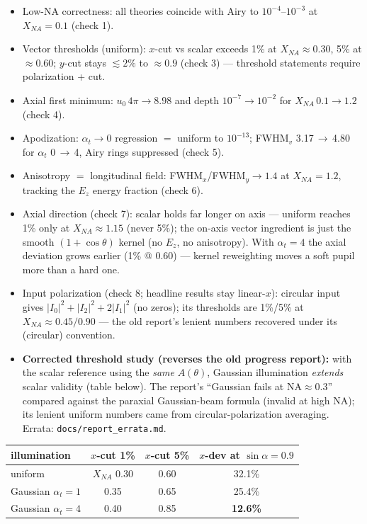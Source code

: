 \documentclass[10pt]{article}
\begin{document}
\begin{itemize}\itemsep1pt
\item Low-NA correctness: all theories coincide with Airy to
  $10^{-4}$--$10^{-3}$ at $X_{NA}=0.1$ (check 1).
\item Vector thresholds (uniform): $x$-cut vs scalar exceeds 1\% at
  $X_{NA}\approx0.30$, 5\% at $\approx0.60$; $y$-cut stays $\lesssim2\%$ to
  $\approx0.9$ (check 3) --- threshold statements require polarization + cut.
\item Axial first minimum: $u_0\,4\pi\!\to\!8.98$ and depth
  $10^{-7}\!\to\!10^{-2}$ for $X_{NA}\,0.1\!\to\!1.2$ (check 4).
\item Apodization: $\alpha_t\to0$ regression $=$ uniform to $10^{-13}$;
  FWHM$_v$ 3.17$\,\to\,$4.80 for $\alpha_t$ 0$\,\to\,$4, Airy rings suppressed
  (check 5).
\item Anisotropy $=$ longitudinal field: FWHM$_x$/FWHM$_y\to1.4$ at
  $X_{NA}=1.2$, tracking the $E_z$ energy fraction (check 6).
\item Axial direction (check 7): scalar holds far longer on axis --- uniform
  reaches 1\% only at $X_{NA}\approx1.15$ (never 5\%); the on-axis vector
  ingredient is just the smooth $(1+\cos\theta)$ kernel (no $E_z$, no
  anisotropy). With $\alpha_t{=}4$ the axial deviation grows earlier
  (1\% @ 0.60) --- kernel reweighting moves a soft pupil more than a hard one.
\item Input polarization (check 8; headline results stay linear-$x$):
  circular input gives $|I_0|^2+|I_2|^2+2|I_1|^2$ (no zeros); its thresholds
  are 1\%/5\% at $X_{NA}\approx0.45/0.90$ --- the old report's lenient numbers
  recovered under its (circular) convention.
\item \textbf{Corrected threshold study (reverses the old progress report):}
  with the scalar reference using the \emph{same} $A(\theta)$, Gaussian
  illumination \emph{extends} scalar validity (table below). The report's
  ``Gaussian fails at NA$\approx$0.3'' compared against the paraxial
  Gaussian-beam formula (invalid at high NA); its lenient uniform numbers came
  from circular-polarization averaging. Errata: \texttt{docs/report\_errata.md}.
\end{itemize}

\begin{center}
\small
\begin{tabular}{lccc}
\toprule
illumination & $x$-cut 1\% & $x$-cut 5\% & $x$-dev at $\sin\alpha=0.9$\\
\midrule
uniform & $X_{NA}$ 0.30 & 0.60 & 32.1\%\\
Gaussian $\alpha_t{=}1$ & 0.35 & 0.65 & 25.4\%\\
Gaussian $\alpha_t{=}4$ & 0.40 & 0.85 & \textbf{12.6\%}\\
\bottomrule
\end{tabular}
\end{center}
\end{document}
